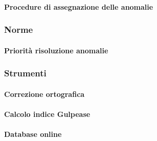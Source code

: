 \paragraph{Procedure di assegnazione delle anomalie}

\subsubsection{Norme}
\paragraph{Priorità risoluzione anomalie}

\subsubsection{Strumenti}
\paragraph{Correzione ortografica}
\paragraph{Calcolo indice Gulpease}
\paragraph{Database online}